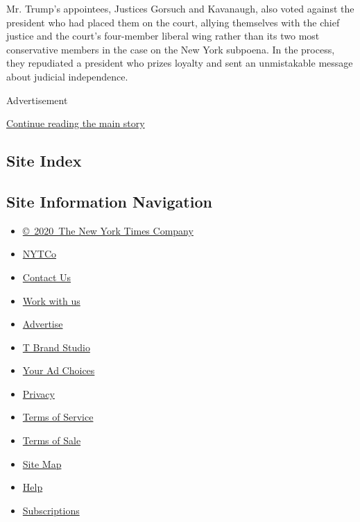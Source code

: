 Mr. Trump's appointees, Justices Gorsuch and Kavanaugh, also voted
against the president who had placed them on the court, allying
themselves with the chief justice and the court's four-member liberal
wing rather than its two most conservative members in the case on the
New York subpoena. In the process, they repudiated a president who
prizes loyalty and sent an unmistakable message about judicial
independence.

Advertisement

\protect\hyperlink{after-bottom}{Continue reading the main story}

\hypertarget{site-index}{%
\subsection{Site Index}\label{site-index}}

\hypertarget{site-information-navigation}{%
\subsection{Site Information
Navigation}\label{site-information-navigation}}

\begin{itemize}
\tightlist
\item
  \href{https://help.nytimes.com/hc/en-us/articles/115014792127-Copyright-notice}{©~2020~The
  New York Times Company}
\end{itemize}

\begin{itemize}
\tightlist
\item
  \href{https://www.nytco.com/}{NYTCo}
\item
  \href{https://help.nytimes.com/hc/en-us/articles/115015385887-Contact-Us}{Contact
  Us}
\item
  \href{https://www.nytco.com/careers/}{Work with us}
\item
  \href{https://nytmediakit.com/}{Advertise}
\item
  \href{http://www.tbrandstudio.com/}{T Brand Studio}
\item
  \href{https://www.nytimes.com/privacy/cookie-policy\#how-do-i-manage-trackers}{Your
  Ad Choices}
\item
  \href{https://www.nytimes.com/privacy}{Privacy}
\item
  \href{https://help.nytimes.com/hc/en-us/articles/115014893428-Terms-of-service}{Terms
  of Service}
\item
  \href{https://help.nytimes.com/hc/en-us/articles/115014893968-Terms-of-sale}{Terms
  of Sale}
\item
  \href{https://spiderbites.nytimes.com}{Site Map}
\item
  \href{https://help.nytimes.com/hc/en-us}{Help}
\item
  \href{https://www.nytimes.com/subscription?campaignId=37WXW}{Subscriptions}
\end{itemize}
